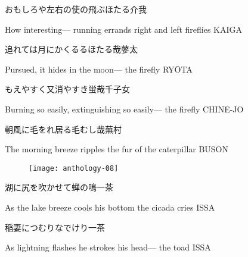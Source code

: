\begin{haiku}
    {\FH おもしろや左右の使の飛ぶほたる}\hfill{\FH 介我}

    \vin{} How interesting---
    \vin{} \vin{} running errands right and left
    \vin{} \vin{} \vin{} fireflies \hspace{\fill} KAIGA
\end{haiku}

\begin{haiku}
    {\FH 追れては月にかくるるほたる哉}\hfill{\FH 蓼太}

    \vin{} Pursued,
    \vin{} \vin{} it hides in the moon---
    \vin{} \vin{} \vin{} the firefly \hspace{\fill} RY\={O}TA
\end{haiku}

\begin{haiku}
    {\FH もえやすく又消やすき蛍哉}\hfill{\FH 千子女}

    \vin{} Burning so easily,
    \vin{} \vin{} extinguishing so easily---
    \vin{} \vin{} \vin{} the firefly \hspace{\fill} CHINE-JO
\end{haiku}

\begin{haiku}
    {\FH 朝風に毛をれ居る毛むし哉}\hfill{\FH 蕪村}

    \vin{} The morning breeze
    \vin{} \vin{} ripples the fur
    \vin{} \vin{} \vin{} of the caterpillar \hspace{\fill} BUSON
\end{haiku}

\begin{figure}
    \texttt{[image: anthology-08]}
\end{figure}

\begin{haiku}
    {\FH 湖に尻を吹かせて蝉の鳴}\hfill{\FH 一茶}

    \vin{} As the lake breeze
    \vin{} \vin{} cools his bottom
    \vin{} \vin{} \vin{} the cicada cries \hspace{\fill} ISSA
\end{haiku}

\begin{haiku}
    {\FH 稲妻につむりなでけり}\hfill{\FH 一茶}

    \vin{} As lightning flashes
    \vin{} \vin{} he strokes his head---
    \vin{} \vin{} \vin{} the toad \hspace{\fill} ISSA
\end{haiku}

